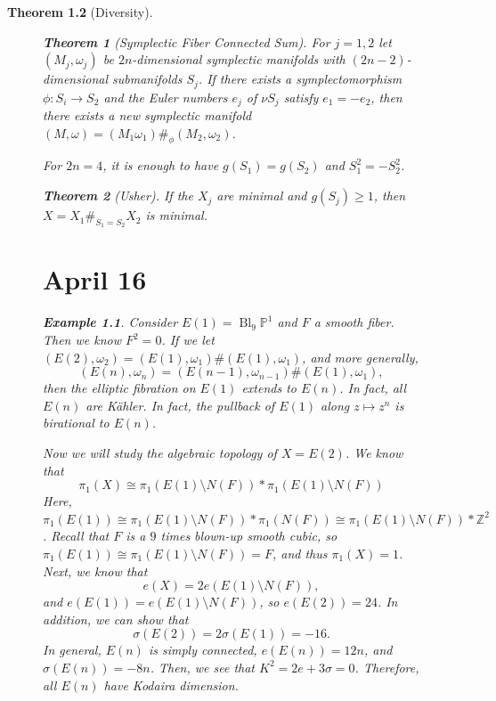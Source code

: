 \documentclass[leqno, openany]{memoir}
\newtheorem{thm}{Theorem}[chapter]
\theoremstyle{definition}
\newtheorem{exm}[thm]{Example}
\theoremstyle{remark}
\theoremstyle{plain}
\theoremstyle{definition}
\theoremstyle{remark}
\newcommand{\Z}{\mathbb{Z}}
\renewcommand{\P}{\mathbb{P}}
\DeclareMathOperator{\Bl}{Bl} %
\begin{document}
\begin{thm}[Diversity]
\begin{figure}[H]
    \begin{thm}[Symplectic Fiber Connected Sum] For $j = 1,2$ let $(M_j,
        \omega_j)$ be $2n$-dimensional symplectic manifolds with
        $(2n-2)$-dimensional submanifolds $S_j$. If there exists a
        symplectomorphism $\phi: S_i \to S_2$ and the Euler numbers $e_j$ of
        $\nu S_j$ satisfy $e_1 = -e_2$, then there exists a new symplectic
        manifold $(M, \omega) = (M_1 \omega_1) \#_{\phi} (M_2, \omega_2)$.

        For $2n = 4$, it is enough to have $g(S_1) = g(S_2)$ and $S_1^2 =
    -S_2^2$.  \end{thm}

    \begin{thm}[Usher] If the $X_j$ are minimal and $g(S_j) \geq 1$, then $X =
    X_1 \#_{S_1 = S_2} X_2$ is minimal.  \end{thm}

    \chapter{April 16}%
    
    \begin{exm} Consider $E(1) = \Bl_9 \P^1$ and $F$ a smooth fiber. Then we
        know $F^2 = 0$. If we let $(E(2), \omega_2) = (E(1), \omega_1) \#
        (E(1), \omega_1)$, and more generally, \[ (E(n), \omega_n) = (E(n-1),
        \omega_{n-1}) \# (E(1), \omega_1), \] then the elliptic fibration on
    $E(1)$ extends to $E(n)$. In fact, all $E(n)$ are K\"ahler. In fact, the
pullback of $E(1)$ along $z \mapsto z^n$ is birational to $E(n)$.  \end{exm}

    Now we will study the algebraic topology of $X = E(2)$. We know that \[
    \pi_1(X) \cong \pi_1(E(1) \setminus N(F)) * \pi_1(E(1) \setminus N(F)) \]
    Here, $\pi_1(E(1)) \cong \pi_1(E(1) \setminus N(F)) * \pi_1(N(F)) \cong
    \pi_1(E(1) \setminus N(F)) * \Z^2$. Recall that $F$ is a $9$ times blown-up
    smooth cubic, so $\pi_1(E(1)) \cong \pi_1(E(1) \setminus N(F)) = F$, and
    thus $\pi_1(X) = 1$. Next, we know that \[ e(X) = 2e(E(1) \setminus N(F)),
        \] and $e(E(1)) = e(E(1) \setminus N(F))$, so $e(E(2)) = 24$. In
        addition, we can show that \[ \sigma(E(2)) = 2 \sigma(E(1)) = -16. \]
        In general, $E(n)$ is simply connected, $e(E(n)) = 12n$, and
        $\sigma(E(n)) = -8n$. Then, we see that $K^2 = 2e + 3 \sigma = 0$.
        Therefore, all $E(n)$ have Kodaira dimension.


\end{figure}
\end{thm}
\end{document}
